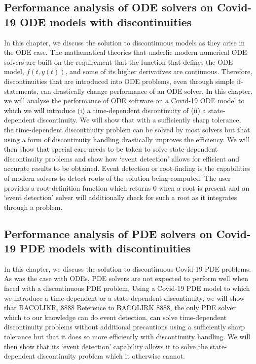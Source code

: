 \documentclass{article}
\begin{document}
\subsection{Performance analysis of ODE solvers on Covid-19 ODE models with discontinuities}
In this chapter, we discuss the solution to discontinuous models as they arise in the ODE case. The mathematical theories that underlie modern numerical ODE solvers are built on the requirement that the function that defines the ODE model, $f(t, y(t))$, and some of its higher derivatives are continuous. Therefore, discontinuities that are introduced into ODE problems, even through simple if-statements, can drastically change performance of an ODE solver. In this chapter, we will analyse the performance of ODE software on a Covid-19 ODE model to which we will introduce (i) a time-dependent discontinuity of (ii) a state-dependent discontinuity. We will show that with a sufficiently sharp tolerance, the time-dependent discontinuity problem can be solved by most solvers but that using a form of discontinuity handling drastically improves the efficiency. We will then show that special care needs to be taken to solve state-dependent discontinuity problems and show how `event detection' allows for efficient and accurate results to be obtained. Event detection or root-finding is the capabilities of modern solvers to detect roots of the solution being computed. The user provides a root-definition function which returns 0 when a root is present and an `event detection' solver will additionally check for such a root as it integrates through a problem.

\subsection{Performance analysis of PDE solvers on Covid-19 PDE models with discontinuities}
In this chapter, we discuss the solution to discontinuous Covid-19 PDE problems. As was the case with ODEs, PDE solvers are not expected to perform well when faced with a discontinuous PDE problem. Using a Covid-19 PDE model to which we introduce a time-dependent or a state-dependent discontinuity, we will show that BACOLIKR, 8888 Reference to BACOLIRK 8888, the only PDE solver which to our knowledge can do event detection, can solve time-dependent discontinuity problems without additional precautions using a sufficiently sharp tolerance but that it does so more efficiently with discontinuity handling. We will then show that its `event detection' capability allows it to solve the state-dependent discontinuity problem which it otherwise cannot.
\end{document}
